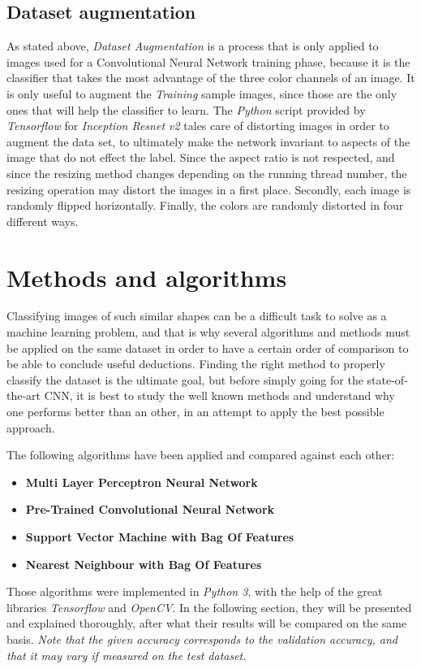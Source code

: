 \documentclass[conference]{IEEEtran}
\begin{document}
\subsection{Dataset augmentation}
As stated above, \emph{Dataset Augmentation} is a process that is only applied to images used for a Convolutional Neural Network training phase, because it is the classifier that takes the most advantage of the three color channels of an image. It is only useful to augment the \emph{Training} sample images, since those are the only ones that will help the classifier to learn.
The \emph{Python} script provided by \emph{Tensorflow} for \emph{Inception Resnet v2} tales care of distorting images in order to augment the data set, to ultimately make the network invariant to aspects of the image that do not effect the label. Since the aspect ratio is not respected, and since the resizing method changes depending on the running thread number, the resizing operation may distort the images in a first place. Secondly, each image is randomly flipped horizontally. Finally, the colors are randomly distorted in four different ways.

\section{Methods and algorithms}
Classifying images of such similar shapes can be a difficult task to solve as a machine learning problem, and that is why several algorithms and methods must be applied on the same dataset in order to have a certain order of comparison to be able to conclude useful deductions.
Finding the right method to properly classify the dataset is the ultimate goal, but before simply going for the state-of-the-art CNN, it is best to study the well known methods and understand why one performs better than an other, in an attempt to apply the best possible approach.

The following algorithms have been applied and compared against each other:
\begin{itemize}
    \item \textbf{Multi Layer Perceptron Neural Network}
    \item \textbf{Pre-Trained Convolutional Neural Network}
    \item \textbf{Support Vector Machine with Bag Of Features}
    \item \textbf{Nearest Neighbour with Bag Of Features}
\end{itemize}

Those algorithms were implemented in \emph{Python 3}, with the help of the great libraries \emph{Tensorflow} and \emph{OpenCV}. In the following section, they will be presented and explained thoroughly, after what their results will be compared on the same basis. \emph{Note that the given accuracy corresponds to the validation accuracy, and that it may vary if measured on the test dataset.}
\end{document}
